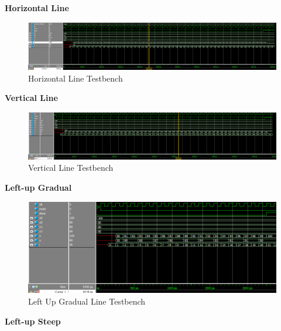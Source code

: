 \documentclass[11pt, titlepage]{article}
\begin{document}
            \begin{description}
                \item \textbf{Horizontal Line} \\
                    \begin{figure}[H]
                        \centering
                        \includegraphics[scale = 0.5]{Images/horizontal line testbench.png}
                        \caption{Horizontal Line Testbench}
                    \end{figure}
                \item \textbf{Vertical Line} \\
                    \begin{figure}[H]
                        \centering
                        \includegraphics[scale = 0.5]{Images/vertical line testbench.png}
                        \caption{Vertical Line Testbench}
                    \end{figure}
                \item \textbf{Left-up Gradual} \\
                    \begin{figure}[H]
                        \centering
                        \includegraphics[scale = 0.6]{Images/left-up gradual line testbench.png}
                        \caption{Left Up Gradual Line Testbench}
                    \end{figure}
                \item \textbf{Left-up Steep} \\

\end{description}
\end{document}
